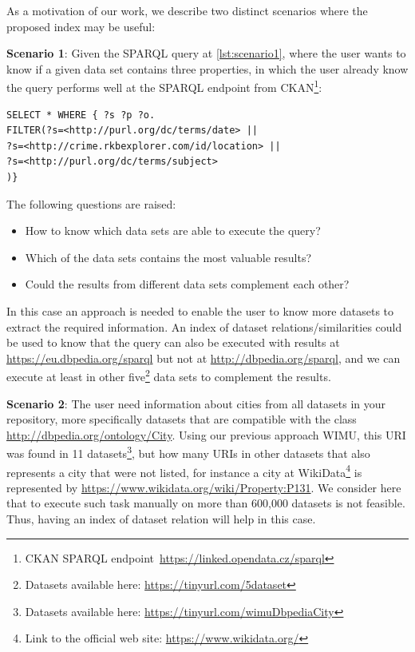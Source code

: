 As a motivation of our work, we describe two distinct scenarios where the proposed index may be useful:

\textbf{Scenario 1}: Given the SPARQL query at \cref{lst:scenario1}, where the user wants to know if a given data set contains three properties, in which the user already know the query performs well at the SPARQL endpoint from CKAN\footnote{  CKAN SPARQL endpoint~\url{https://linked.opendata.cz/sparql}}:

\begin{lstlisting}[language=SPARQL, label={lst:scenario1}, caption=Scenario 1.]
SELECT * WHERE { ?s ?p ?o.
FILTER(?s=<http://purl.org/dc/terms/date> || 
?s=<http://crime.rkbexplorer.com/id/location> || 
?s=<http://purl.org/dc/terms/subject>
)}
\end{lstlisting}
The following questions are raised:
\begin{itemize}
    \item How to know which data sets are able to execute the query?
    \item Which of the data sets contains the most valuable results?
    \item Could the results from different data sets complement each other?
\end{itemize}

In this case an approach is needed to enable the user to know more datasets to extract the required information. An index of dataset relations/similarities could be used to know that the query can also be executed with results at \url{https://eu.dbpedia.org/sparql} but not at \url{http://dbpedia.org/sparql}, and we can execute at least in other five\footnote{Datasets available here: \url{https://tinyurl.com/5dataset}} data sets to complement the results.

\textbf{Scenario 2}: The user need information about cities from all datasets in your repository, more specifically datasets that are compatible with the class \url{http://dbpedia.org/ontology/City}. Using our previous approach WIMU\cite{valdestilhas2018my}, this URI was found in 11 datasets\footnote{Datasets available here: \url{https://tinyurl.com/wimuDbpediaCity}}, but how many URIs in other datasets that also represents a city that were not listed, for instance a city at WikiData\footnote{Link to the official web site:  \url{https://www.wikidata.org/}} is represented by  \url{https://www.wikidata.org/wiki/Property:P131}.
We consider here that to execute such task manually on more than 600,000 datasets is not feasible. Thus, having an index of dataset relation will help in this case.

